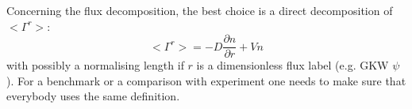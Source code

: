 Concerning the flux decomposition, the best choice is a direct decomposition of $<\Gamma^r>$:
\begin{equation}
 <\Gamma^r> = - D \frac{\partial n}{\partial r} + V n
\end{equation}
with possibly a normalising length if $r$ is a dimensionless flux label (e.g. GKW $\psi$).
For a benchmark or a comparison with experiment one needs to make sure that everybody uses the same definition.






